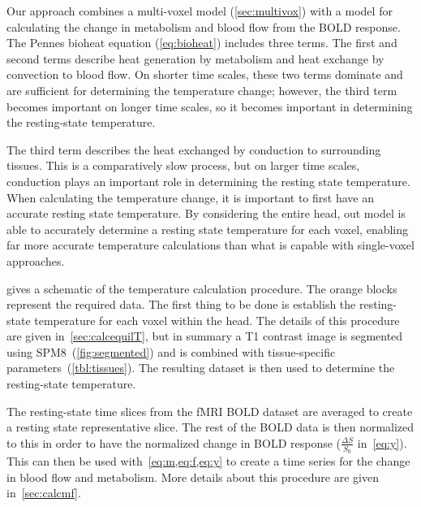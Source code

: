   Our approach combines a multi-voxel model (\cref{sec:multivox}) with a model for calculating the change in metabolism and blood flow from the BOLD response.  The Pennes bioheat equation (\cref{eq:bioheat}) \citep{pennes,sotero2011} includes three terms. The first and second terms describe heat generation by metabolism and heat exchange by convection to blood flow.  On shorter time scales, these two terms dominate and are sufficient for determining the temperature change; however, the third term becomes important on longer time scales, so it becomes important in determining the resting-state temperature.
  
  The third term describes the heat exchanged by conduction to surrounding tissues.  This is a comparatively slow process, but on larger time scales, conduction plays an important role in determining the resting state temperature.  When calculating the temperature change, it is important to first have an accurate resting state temperature.  By considering the entire head, out model is able to accurately determine a resting state temperature for each voxel, enabling far more accurate temperature calculations than what is capable with single-voxel approaches.  
  
   gives a schematic of the temperature calculation procedure.  The orange blocks represent the required data.  The first thing to be done is establish the resting-state temperature for each voxel within the head.  The details of this procedure are given in~\cref{sec:calcequilT}, but in summary a T1 contrast image is segmented using SPM8~(\cref{fig:segmented}) and is combined with tissue-specific parameters~(\cref{tbl:tissues}).  The resulting dataset is then used to determine the resting-state temperature. 
  
  The resting-state time slices from the fMRI BOLD dataset are averaged to create a resting state representative slice.  The rest of the BOLD data is then normalized to this in order to have the normalized change in BOLD response ($\frac{\Delta S}{S_0}$ in~\cref{eq:y}).  This can then be used with~\cref{eq:m,eq:f,eq:y} to create a time series for the change in blood flow and metabolism.  More details about this procedure are given in~\cref{sec:calcmf}.
  
  
  
